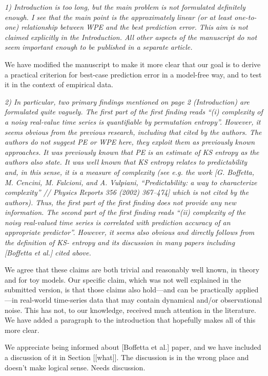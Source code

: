 \documentclass[12pt]{article}
\newcommand{\alert}[1]{{\color{red}#1}}
\begin{document}
\emph{1) Introduction is too long, but the main problem is not
  formulated definitely enough. I see that the main point is the
  approximately linear (or at least one-to-one) relationship between
  WPE and the best prediction error. This aim is not claimed
  explicitly in the Introduction. All other aspects of the manuscript
  do not seem important enough to be published in a separate article.}

We have modified the manuscript to make it more clear that our goal is
to derive a practical criterion for best-case prediction error in a
model-free way, and to test it in the context of empirical data.

\emph{2) In particular, two primary findings mentioned on page 2
  (Introduction) are formulated quite vaguely. The first part of the
  first finding reads ``(i) complexity of a noisy real-value time
  series is quantifiable by permutation entropy''. However, it seems
  obvious from the previous research, including that cited by the
  authors. The authors do not suggest PE or WPE here, they exploit
  them as previously known approaches. It was previously known that PE
  is an estimate of KS entropy as the authors also state. It was well
  known that KS entropy relates to predictability and, in this sense,
  it is a measure of complexity (see e.g. the work [G. Boffetta,
    M. Cencini, M. Falcioni, and A.  Vulpiani, ``Predictability: a way
    to characterize complexity'' // Physics Reports 356 (2002)
    367–474] which is not cited by the authors). Thus, the first part
  of the first finding does not provide any new information. The
  second part of the first finding reads ``(ii) complexity of the
  noisy real-valued time series is correlated with prediction accuracy
  of an appropriate predictor''.  However, it seems also obvious and
  directly follows from the definition of KS- entropy and its
  discussion in many papers including [Boffetta et al.] cited above.}

We agree that these claims are both trivial and reasonably well known,
in theory and for toy models.  Our specific claim, which was not well
explained in the submitted version, is that those claims also
hold---and can be practically applied---in real-world time-series data
that may contain dynamical and/or observational noise.  This has not,
to our knowledge, received much attention in the literature.  We have
added a paragraph to the introduction that hopefully makes all of this
more clear.

\alert{We appreciate being informed about [Boffetta et al.]  paper,
  and we have included a discussion of it in Section [[what]].  The
  discussion is in the wrong place and doesn't make logical sense.
  Needs discussion.}
\end{document}
